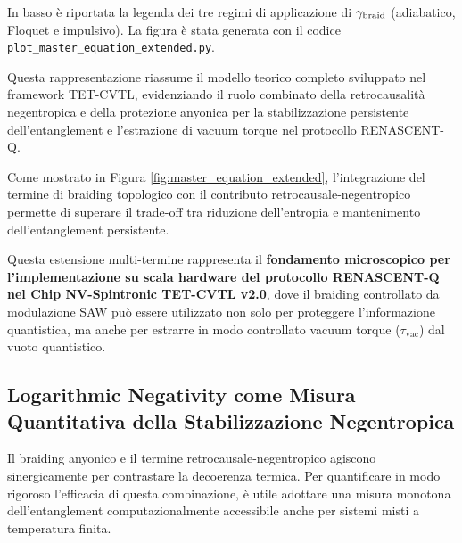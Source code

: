 \documentclass[11pt,a4paper]{article}
\let\oldref\ref
\renewcommand{\ref}{\protect\oldref}
\theoremstyle{plain}
\theoremstyle{definition}
\begin{document}
\vspace{0.3cm}

In basso è riportata la legenda dei tre regimi di applicazione di $\gamma_{\rm braid}$ (adiabatico, Floquet e impulsivo). 
La figura è stata generata con il codice \texttt{plot\_master\_equation\_extended.py}. 


\vspace{0.4cm}

Questa rappresentazione riassume il modello teorico completo sviluppato nel framework TET-CVTL, evidenziando il ruolo combinato della retrocausalità negentropica e della protezione anyonica per la stabilizzazione persistente dell'entanglement e l'estrazione di vacuum torque nel protocollo RENASCENT-Q.


\vspace{0.5cm}


Come mostrato in Figura \ref{fig:master_equation_extended}, l'integrazione del termine di braiding topologico con il contributo retrocausale-negentropico permette di superare il trade-off tra riduzione dell'entropia e mantenimento dell'entanglement persistente. 


\vspace{0.4cm}

Questa estensione multi-termine rappresenta il \textbf{fondamento microscopico per l'implementazione su scala hardware del protocollo RENASCENT-Q nel Chip NV-Spintronic TET-CVTL v2.0}, dove il braiding controllato da modulazione SAW può essere utilizzato non solo per proteggere l'informazione quantistica, ma anche per estrarre in modo controllato vacuum torque ($\tau_{\text{vac}}$) dal vuoto quantistico.




\vspace{0.7cm}




\subsection{Logarithmic Negativity come Misura Quantitativa della Stabilizzazione Negentropica}


\vspace{0.2cm}

Il braiding anyonico e il termine retrocausale-negentropico agiscono sinergicamente per contrastare la decoerenza termica. Per quantificare in modo rigoroso l’efficacia di questa combinazione, è utile adottare una misura monotona dell’entanglement computazionalmente accessibile anche per sistemi misti a temperatura finita.
\end{document}
